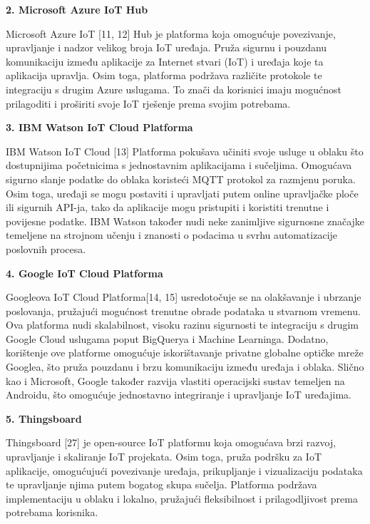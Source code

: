 \documentclass[times, utf8, zavrsni]{fer}
\begin{document}
 \newpage
\textbf{ 2. Microsoft Azure IoT Hub}

Microsoft Azure IoT [11, 12] Hub je platforma koja omogućuje povezivanje, upravljanje i nadzor velikog broja IoT uređaja. Pruža sigurnu i pouzdanu komunikaciju između aplikacije za Internet stvari (IoT) i uređaja koje ta aplikacija upravlja. Osim toga, platforma podržava različite protokole te integraciju s drugim Azure uslugama. To znači da korisnici imaju mogućnost prilagoditi i proširiti svoje IoT rješenje prema svojim potrebama.

\vspace{\baselineskip}

\textbf{3. IBM Watson IoT Cloud Platforma}

IBM Watson IoT Cloud [13] Platforma pokušava učiniti svoje usluge u oblaku što dostupnijima početnicima s jednostavnim aplikacijama i sučeljima. Omogućava sigurno slanje podatke do oblaka koristeći MQTT protokol za razmjenu poruka. Osim toga, uređaji se mogu postaviti i upravljati  putem online upravljačke ploče ili sigurnih API-ja, tako da aplikacije mogu pristupiti i koristiti trenutne i povijesne podatke. IBM Watson također nudi neke zanimljive sigurnosne značajke temeljene na strojnom učenju i znanosti o podacima u svrhu automatizacije poslovnih procesa.

\vspace{\baselineskip}

\textbf{4. Google IoT Cloud Platforma}

Googleova IoT Cloud Platforma[14, 15] usredotočuje se na olakšavanje i ubrzanje poslovanja, pružajući mogućnost trenutne obrade podataka u stvarnom vremenu. Ova platforma nudi skalabilnost, visoku razinu sigurnosti te integraciju s drugim Google Cloud uslugama poput BigQuerya i Machine Learninga. Dodatno, korištenje ove platforme omogućuje iskorištavanje privatne globalne optičke mreže Googlea, što pruža pouzdanu i brzu komunikaciju između uređaja i oblaka. Slično kao i Microsoft, Google također razvija vlastiti operacijski sustav temeljen na Androidu, što omogućuje jednostavno integriranje i upravljanje IoT uređajima.

\textbf{5. Thingsboard}

Thingsboard [27] je open-source IoT platformu koja omogućava brzi razvoj, upravljanje i skaliranje IoT projekata. Osim toga, pruža podršku za IoT aplikacije, omogućujući povezivanje uređaja, prikupljanje i vizualizaciju podataka te upravljanje njima putem bogatog skupa sučelja. Platforma podržava implementaciju u oblaku i lokalno, pružajući fleksibilnost i prilagodljivost prema potrebama korisnika.
\end{document}
